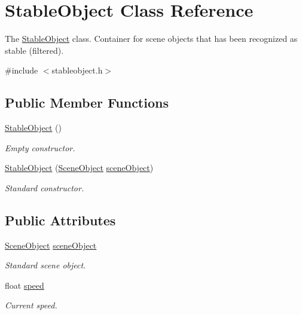 \hypertarget{classStableObject}{\section{\-Stable\-Object \-Class \-Reference}
\label{classStableObject}
}


\-The \hyperlink{classStableObject}{\-Stable\-Object} class. \-Container for scene objects that has been recognized as stable (filtered).  




{\ttfamily \#include $<$stableobject.\-h$>$}

\subsection*{\-Public \-Member \-Functions}
\begin{DoxyCompactItemize}
\item 
\hypertarget{classStableObject_a9e0bde0ac7dfd5964633977adabd44e9}{\hyperlink{classStableObject_a9e0bde0ac7dfd5964633977adabd44e9}{\-Stable\-Object} ()}\label{classStableObject_a9e0bde0ac7dfd5964633977adabd44e9}

\begin{DoxyCompactList}\small\item\em \-Empty constructor. \end{DoxyCompactList}\item 
\hyperlink{classStableObject_a422acb12a9eaa6e75428a1cf95376571}{\-Stable\-Object} (\hyperlink{classSceneObject}{\-Scene\-Object} \hyperlink{classStableObject_af563c559d6ae7b1ddc08f03bd0906576}{scene\-Object})
\begin{DoxyCompactList}\small\item\em \-Standard constructor. \end{DoxyCompactList}\end{DoxyCompactItemize}
\subsection*{\-Public \-Attributes}
\begin{DoxyCompactItemize}
\item 
\hypertarget{classStableObject_af563c559d6ae7b1ddc08f03bd0906576}{\hyperlink{classSceneObject}{\-Scene\-Object} \hyperlink{classStableObject_af563c559d6ae7b1ddc08f03bd0906576}{scene\-Object}}\label{classStableObject_af563c559d6ae7b1ddc08f03bd0906576}

\begin{DoxyCompactList}\small\item\em \-Standard scene object. \end{DoxyCompactList}\item 
\hypertarget{classStableObject_aeb58f7a171782f3d4479f63919199ed7}{float \hyperlink{classStableObject_aeb58f7a171782f3d4479f63919199ed7}{speed}}\label{classStableObject_aeb58f7a171782f3d4479f63919199ed7}

\begin{DoxyCompactList}\small\item\em \-Current speed. \end{DoxyCompactList}\end{DoxyCompactItemize}


